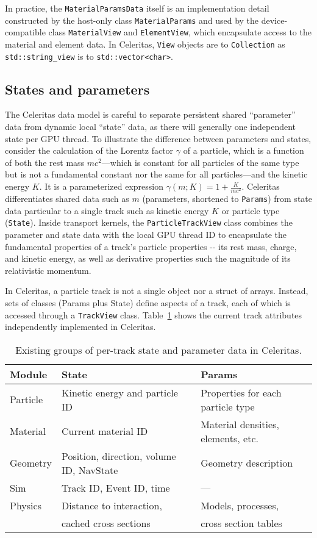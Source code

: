 In practice, the \texttt{MaterialParamsData} itself is an implementation
detail constructed by the host-only class \texttt{MaterialParams} and
used by the device-compatible class \texttt{MaterialView} and
\texttt{ElementView}, which encapsulate access to the material and
element data. In Celeritas, \texttt{View} objects are to
\texttt{Collection} as \texttt{std::string\_view} is to
\texttt{std::vector\textless{}char\textgreater{}}.

\subsection{States and parameters}\label{states-and-parameters}

The Celeritas data model is careful to separate persistent shared
``parameter'' data from dynamic local ``state'' data, as there will
generally one independent state per GPU thread. To illustrate the
difference between parameters and states, consider the calculation of
the Lorentz factor \(\gamma\) of a particle, which is a function of both
the rest mass \(mc^2\)---which is constant for all particles of the same
type but is not a fundamental constant nor the same for all
particles---and the kinetic energy \(K\). It is a parameterized
expression \(\gamma(m;K) = 1 + \frac{K}{mc^2}\). Celeritas
differentiates shared data such as \(m\) (parameters, shortened to
\texttt{Params}) from state data particular to a single track such as
kinetic energy \(K\) or particle type (\texttt{State}). Inside transport
kernels, the \texttt{ParticleTrackView} class combines the parameter and
state data with the local GPU thread ID to encapsulate the fundamental
properties of a track's particle properties -\/- its rest mass, charge,
and kinetic energy, as well as derivative properties such the magnitude
of its relativistic momentum.

In Celeritas, a particle track is not a single object nor a struct of
arrays. Instead, sets of classes (Params plus State) define aspects of a
track, each of which is accessed through a \texttt{TrackView} class.
Table~\ref{tab:modules} shows the current track attributes independently
implemented in Celeritas.
%
\begin{table}[htb]
  \centering
  \begin{tabular}{@{}lll@{}}
\toprule
Module & State & Params\tabularnewline
\midrule
Particle & Kinetic energy and particle ID & Properties for each particle
type \\
Material & Current material ID & Material densities, elements,
etc. \\
Geometry & Position, direction, volume ID, NavState & Geometry
description \\
Sim & Track ID, Event ID, time & --- \\
Physics & Distance to interaction, & Models, processes, \\
& cached cross sections & cross section tables \\
\bottomrule
  \end{tabular}
  \caption{Existing groups of per-track state and parameter data in Celeritas.}
  \label{tab:modules}
\end{table}

